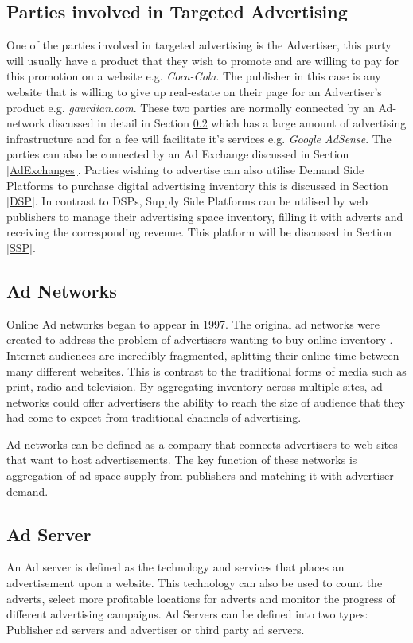 \documentclass{article}
\begin{document}
\subsection{Parties involved in Targeted Advertising}
One of the parties involved in targeted advertising is the Advertiser, this party will usually have a product that they wish to promote and are willing to pay for this promotion on a website e.g. \textit{Coca-Cola}. The publisher in this case is any website that is willing to give up real-estate on their page for an Advertiser's product e.g. \textit{gaurdian.com}. These two parties are normally connected by an Ad-network discussed in detail in Section \ref{AdNetwork} which has a large amount of advertising infrastructure and for a fee will facilitate it's services e.g. \textit{Google AdSense}. The parties can also be connected by an Ad Exchange discussed in Section \ref{AdExchanges}. Parties wishing to advertise can also utilise Demand Side Platforms to purchase digital advertising inventory this is discussed in Section \ref{DSP}. In contrast to DSPs, Supply Side Platforms can be utilised by web publishers to manage their advertising space inventory, filling it with adverts and receiving the corresponding revenue. This platform will be discussed in Section \ref{SSP}.  


\subsection{Ad Networks} \label{AdNetwork}
Online Ad networks began to appear in 1997. The original ad networks were created to address the problem of advertisers wanting to buy online inventory \parencite{adExchanges}. Internet audiences are incredibly fragmented, splitting their online time between many different websites. This is contrast to the traditional forms of media such as print, radio and television. By aggregating inventory across multiple sites, ad networks could offer advertisers the ability to reach the size of audience that they had come to expect from traditional channels of advertising. \newline

Ad networks can be defined as a company that connects advertisers to web sites that want to host advertisements. The key function of these networks is aggregation of ad space supply from publishers and matching it with advertiser demand. 

\subsection{Ad Server}
An Ad server is defined as the technology and services that places an advertisement upon a website. This technology can also be used to count the adverts, select more profitable locations for adverts and monitor the progress of different advertising campaigns. Ad Servers can be defined into two types: Publisher ad servers and advertiser or third party ad servers. \newline 
\end{document}
